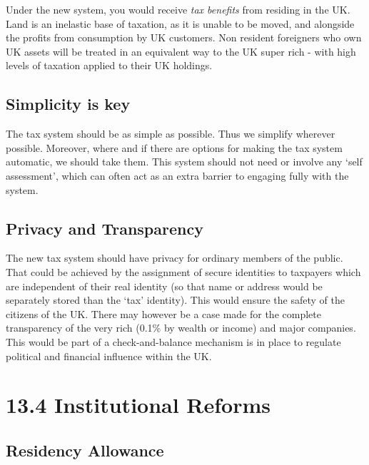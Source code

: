 \documentclass[]{tufte-handout}
\begin{document}
Under the new system, you would receive \emph{tax benefits} from
residing in the UK. Land is an inelastic base of taxation, as it is
unable to be moved, and alongside the profits from consumption by UK
customers. Non resident foreigners who own UK assets will be treated in
an equivalent way to the UK super rich - with high levels of taxation
applied to their UK holdings.

\hypertarget{simplicity-is-key}{%
\subsection{Simplicity is key}\label{simplicity-is-key}}

The tax system should be as simple as possible. Thus we simplify
wherever possible. Moreover, where and if there are options for making
the tax system automatic, we should take them. This system should not
need or involve any `self assessment', which can often act as an extra
barrier to engaging fully with the system.

\hypertarget{privacy-and-transparency}{%
\subsection{Privacy and Transparency}\label{privacy-and-transparency}}

The new tax system should have privacy for ordinary members of the
public. That could be achieved by the assignment of secure identities to
taxpayers which are independent of their real identity (so that name or
address would be separately stored than the `tax' identity). This would
ensure the safety of the citizens of the UK. There may however be a case
made for the complete transparency of the very rich (0.1\% by wealth or
income) and major companies. This would be part of a check-and-balance
mechanism is in place to regulate political and financial influence
within the UK.

\hypertarget{institutional-reforms}{%
\section{13.4 Institutional Reforms}\label{institutional-reforms}}

\hypertarget{residency-allowance}{%
\subsection{Residency Allowance}\label{residency-allowance}}
\end{document}

